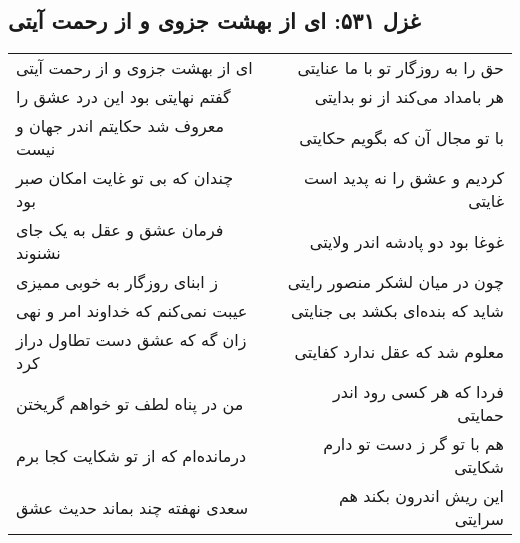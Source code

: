\begin{center}
\section*{غزل ۵۳۱: ای از بهشت جزوی و از رحمت آیتی}
\label{sec:531}
\begin{longtable}{l p{0.5cm} r}
ای از بهشت جزوی و از رحمت آیتی
&&
حق را به روزگار تو با ما عنایتی
\\
گفتم نهایتی بود این درد عشق را
&&
هر بامداد می‌کند از نو بدایتی
\\
معروف شد حکایتم اندر جهان و نیست
&&
با تو مجال آن که بگویم حکایتی
\\
چندان که بی تو غایت امکان صبر بود
&&
کردیم و عشق را نه پدید است غایتی
\\
فرمان عشق و عقل به یک جای نشنوند
&&
غوغا بود دو پادشه اندر ولایتی
\\
ز ابنای روزگار به خوبی ممیزی
&&
چون در میان لشکر منصور رایتی
\\
عیبت نمی‌کنم که خداوند امر و نهی
&&
شاید که بنده‌ای بکشد بی جنایتی
\\
زان گه که عشق دست تطاول دراز کرد
&&
معلوم شد که عقل ندارد کفایتی
\\
من در پناه لطف تو خواهم گریختن
&&
فردا که هر کسی رود اندر حمایتی
\\
درمانده‌ام که از تو شکایت کجا برم
&&
هم با تو گر ز دست تو دارم شکایتی
\\
سعدی نهفته چند بماند حدیث عشق
&&
این ریش اندرون بکند هم سرایتی
\\
\end{longtable}
\end{center}
